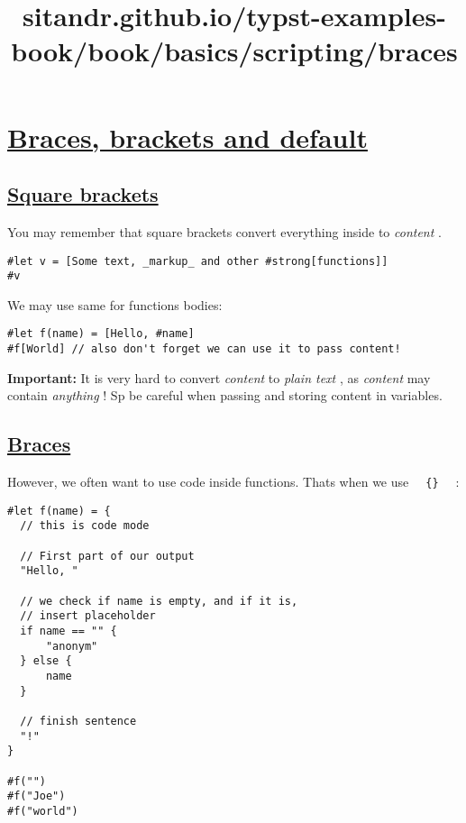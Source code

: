 \title{sitandr.github.io/typst-examples-book/book/basics/scripting/braces}

\section{\texorpdfstring{\hyperref[braces-brackets-and-default]{Braces,
brackets and
default}}{Braces, brackets and default}}\label{braces-brackets-and-default}

\subsection{\texorpdfstring{\hyperref[square-brackets]{Square
brackets}}{Square brackets}}\label{square-brackets}

You may remember that square brackets convert everything inside to
\emph{content} .

\begin{verbatim}
#let v = [Some text, _markup_ and other #strong[functions]]
#v
\end{verbatim}

\pandocbounded{}

We may use same for functions bodies:

\begin{verbatim}
#let f(name) = [Hello, #name]
#f[World] // also don't forget we can use it to pass content!
\end{verbatim}

\pandocbounded{}

\textbf{Important:} It is very hard to convert \emph{content} to
\emph{plain text} , as \emph{content} may contain \emph{anything} ! Sp
be careful when passing and storing content in variables.

\subsection{\texorpdfstring{\hyperref[braces]{Braces}}{Braces}}\label{braces}

However, we often want to use code inside functions.
That\textquotesingle s when we use
\texttt{\ }{\texttt{\ \{\}\ }}\texttt{\ } :

\begin{verbatim}
#let f(name) = {
  // this is code mode

  // First part of our output
  "Hello, "

  // we check if name is empty, and if it is,
  // insert placeholder
  if name == "" {
      "anonym"
  } else {
      name
  }

  // finish sentence
  "!"
}

#f("")
#f("Joe")
#f("world")
\end{verbatim}

